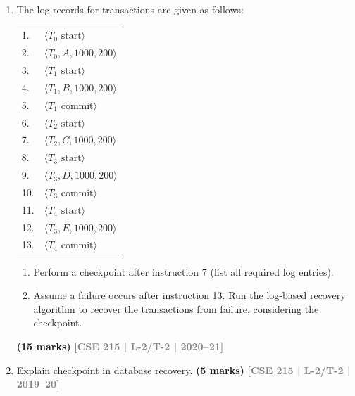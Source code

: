\documentclass[12pt,a3paper]{article}
\newcommand{\yr}[1]{\hfill\textcolor{gray}{\small\textbf{[#1]}}}
\newcommand{\mk}[1]{\textcolor{orange!70!black}{\small\textbf{(#1 marks)}}}
\begin{document}
\begin{enumerate}
\item The log records for transactions are given as follows:
\begin{center}
\small\ttfamily
\begin{tabular}{ll}
1. & $\langle T_0 \text{ start} \rangle$\\
2. & $\langle T_0, A, 1000, 200 \rangle$\\
3. & $\langle T_1 \text{ start} \rangle$\\
4. & $\langle T_1, B, 1000, 200 \rangle$\\
5. & $\langle T_1 \text{ commit} \rangle$\\
6. & $\langle T_2 \text{ start} \rangle$\\
7. & $\langle T_2, C, 1000, 200 \rangle$\\
8. & $\langle T_3 \text{ start} \rangle$\\
9. & $\langle T_3, D, 1000, 200 \rangle$\\
10. & $\langle T_3 \text{ commit} \rangle$\\
11. & $\langle T_4 \text{ start} \rangle$\\
12. & $\langle T_3, E, 1000, 200 \rangle$\\
13. & $\langle T_4 \text{ commit} \rangle$\\
\end{tabular}
\end{center}
\begin{enumerate}
  \item Perform a checkpoint after instruction 7 (list all required log entries).
  \item Assume a failure occurs after instruction 13. Run the log-based recovery algorithm to recover the transactions from failure, considering the checkpoint.
\end{enumerate}
  \mk{15} \yr{CSE 215 | L-2/T-2 | 2020--21}

\item Explain checkpoint in database recovery.
\mk{5} \yr{CSE 215 | L-2/T-2 | 2019--20}


\end{enumerate}
\end{document}
